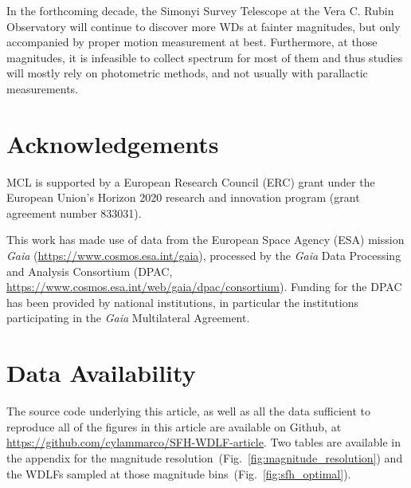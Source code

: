 \documentclass[fleqn,usenatbib]{mnras}
\begin{document}
In the forthcoming decade, the Simonyi Survey Telescope at the Vera C. Rubin
Observatory will continue to discover more WDs at fainter magnitudes, but only
accompanied by proper motion measurement at best. Furthermore, at those
magnitudes, it is infeasible to collect spectrum for most of them and thus
studies will mostly rely on photometric methods, and not usually with
parallactic measurements.

\section*{Acknowledgements}
MCL is supported by a European Research Council (ERC) grant under the European
Union’s Horizon 2020 research and innovation program (grant agreement number
833031).

This work has made use of data from the European Space Agency (ESA) mission
{\it Gaia} (\url{https://www.cosmos.esa.int/gaia}), processed by the {\it Gaia}
Data Processing and Analysis Consortium (DPAC,
\url{https://www.cosmos.esa.int/web/gaia/dpac/consortium}). Funding for the DPAC
has been provided by national institutions, in particular the institutions
participating in the {\it Gaia} Multilateral Agreement.


\section*{Data Availability}
The source code underlying this article, as well as all the data sufficient to reproduce all of the figures in this article are available on Github, at \url{https://github.com/cylammarco/SFH-WDLF-article}. Two tables are available in the appendix for the magnitude resolution~(Fig.~\ref{fig:magnitude_resolution}) and the WDLFs sampled at those magnitude bins~(Fig.~\ref{fig:sfh_optimal}).






\end{document}
